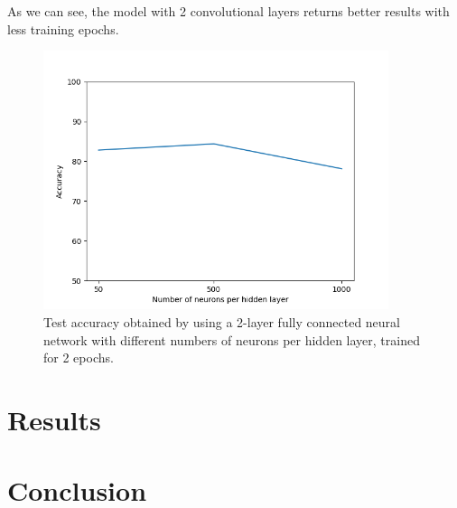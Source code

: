 \documentclass[12pt]{article}
\begin{document}
As we can see, the model with 2 convolutional layers returns better results with less training epochs.

\begin{figure}[h]
	\centering
	\includegraphics[width = 0.9\textwidth]{ex3_CNN2l_accuracy-neurons.png}
	\caption{Test accuracy obtained by using a 2-layer fully connected neural network with different numbers of neurons per hidden layer, trained for 2 epochs.}
	\label{fig:ex3_CNN_neurons}
\end{figure}


\section{Results}

\section{Conclusion}

% 
% 
\end{document}
